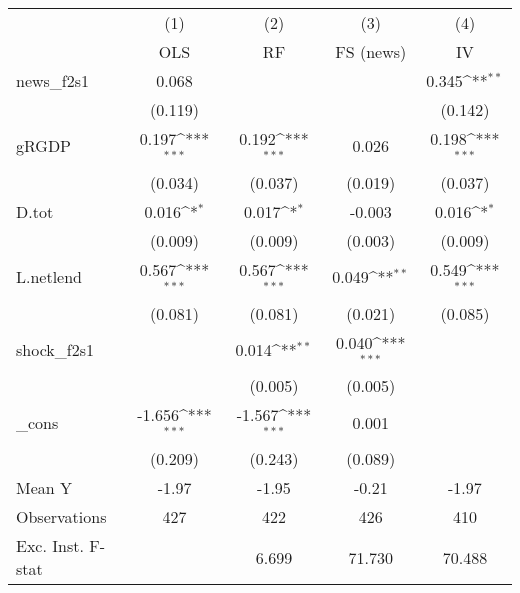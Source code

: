 {
\def\sym#1{\ifmmode^{#1}\else\(^{#1}\)\fi}
\begin{tabular}{l*{4}{c}}
\toprule
            &\multicolumn{1}{c}{(1)}&\multicolumn{1}{c}{(2)}&\multicolumn{1}{c}{(3)}&\multicolumn{1}{c}{(4)}\\
            &\multicolumn{1}{c}{OLS}&\multicolumn{1}{c}{RF}&\multicolumn{1}{c}{FS (news)}&\multicolumn{1}{c}{IV}\\
\midrule
news\_f2s1   &       0.068         &                     &                     &       0.345\sym{**} \\
            &     (0.119)         &                     &                     &     (0.142)         \\
\addlinespace
gRGDP       &       0.197\sym{***}&       0.192\sym{***}&       0.026         &       0.198\sym{***}\\
            &     (0.034)         &     (0.037)         &     (0.019)         &     (0.037)         \\
\addlinespace
D.tot       &       0.016\sym{*}  &       0.017\sym{*}  &      -0.003         &       0.016\sym{*}  \\
            &     (0.009)         &     (0.009)         &     (0.003)         &     (0.009)         \\
\addlinespace
L.netlend   &       0.567\sym{***}&       0.567\sym{***}&       0.049\sym{**} &       0.549\sym{***}\\
            &     (0.081)         &     (0.081)         &     (0.021)         &     (0.085)         \\
\addlinespace
shock\_f2s1  &                     &       0.014\sym{**} &       0.040\sym{***}&                     \\
            &                     &     (0.005)         &     (0.005)         &                     \\
\addlinespace
\_cons      &      -1.656\sym{***}&      -1.567\sym{***}&       0.001         &                     \\
            &     (0.209)         &     (0.243)         &     (0.089)         &                     \\
\midrule
Mean Y      &       -1.97         &       -1.95         &       -0.21         &       -1.97         \\
Observations&         427         &         422         &         426         &         410         \\
Exc. Inst. F-stat&                     &       6.699         &      71.730         &      70.488         \\
\bottomrule
\end{tabular}
}
